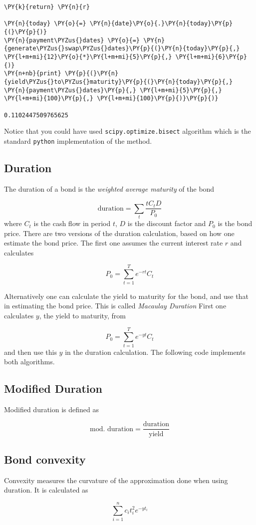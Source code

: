 \begin{codebox}
\begin{Verbatim}[commandchars=\\\{\}]
    \PY{k}{return} \PY{n}{r}
		
\PY{n}{today} \PY{o}{=} \PY{n}{date}\PY{o}{.}\PY{n}{today}\PY{p}{(}\PY{p}{)}
\PY{n}{payment\PYZus{}dates} \PY{o}{=} \PY{n}{generate\PYZus{}swap\PYZus{}dates}\PY{p}{(}\PY{n}{today}\PY{p}{,} \PY{l+m+mi}{12}\PY{o}{*}\PY{l+m+mi}{5}\PY{p}{,} \PY{l+m+mi}{6}\PY{p}{)}
\PY{n+nb}{print} \PY{p}{(}\PY{n}{yield\PYZus{}to\PYZus{}maturity}\PY{p}{(}\PY{n}{today}\PY{p}{,} \PY{n}{payment\PYZus{}dates}\PY{p}{,} \PY{l+m+mi}{5}\PY{p}{,} \PY{l+m+mi}{100}\PY{p}{,} \PY{l+m+mi}{100}\PY{p}{)}\PY{p}{)}

0.1102447509765625
\end{Verbatim}
\end{codebox}

Notice that you could have used \texttt{scipy.optimize.bisect} algorithm which is the standard \texttt{python} 
implementation of the method.

\subsection{Duration}
The duration of a bond is the \emph{weighted average maturity} of the bond

\begin{equation}
	\textrm{duration} = \sum_t \frac{t C_t D}{P_0} 
\end{equation}
where $C_t$ is the cash flow in period $t$, $D$ is the discount factor and $P_0$ is the bond price.
There are two versions of the duration calculation, based on how one estimate the bond price. The first one assumes the current interest rate $r$ and calculates

\begin{equation}
	P_0 = \sum_{t=1}^T e^{-rt}C_t
\end{equation}

Alternatively one can calculate the yield to maturity for the bond, and use that in estimating the bond price. This is called \emph{Macaulay Duration} First one calculates $y$, the yield to maturity, from

\begin{equation}
	P_0 = \sum_{t=1}^T e^{-yt}C_t
\end{equation}
and then use this $y$ in the duration calculation.
The following code implements both algorithms.


\subsection{Modified Duration}
Modified duration is defined as

\begin{equation}
	\textrm{mod. duration} = \frac{\textrm{duration}}{\textrm{yield}} 
\end{equation}

\subsection{Bond convexity}
Convexity measures the curvature of the approximation done when using duration. It is calculated as

\begin{equation}
	\sum_{i=1}^nc_it_i^2e^{-yt_i}
\end{equation}

